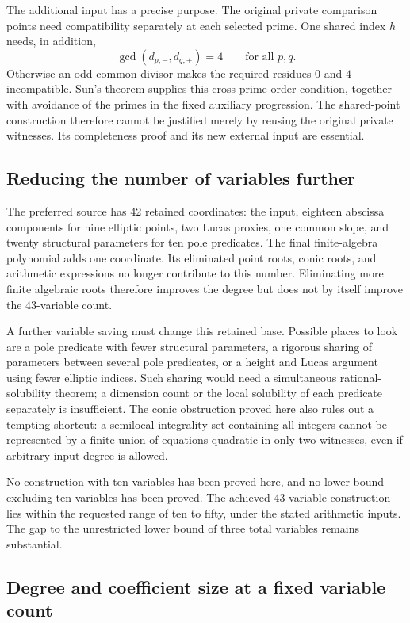 \documentclass[11pt]{article}
\theoremstyle{definition}
\begin{document}
The additional input has a precise purpose. The original private
comparison points need compatibility separately at each selected prime.
One shared index $h$ needs, in addition,
\[
             \gcd(d_{p,-},d_{q,+})=4\qquad\text{for all }p,q.
\]
Otherwise an odd common divisor makes the required residues $0$ and $4$
incompatible. Sun's theorem supplies this cross-prime order condition,
together with avoidance of the primes in the fixed auxiliary progression.
The shared-point construction therefore cannot be justified merely by
reusing the original private witnesses. Its completeness proof and its
new external input are essential.

\subsection{Reducing the number of variables further}

The preferred source has 42 retained coordinates: the input, eighteen
abscissa components for nine elliptic points, two Lucas proxies, one
common slope, and twenty structural parameters for ten pole predicates.
The final finite-algebra polynomial adds one coordinate. Its eliminated
point roots, conic roots, and arithmetic expressions no longer contribute
to this number. Eliminating more finite algebraic roots therefore improves
the degree but does not by itself improve the 43-variable count.

A further variable saving must change this retained base. Possible places
to look are a pole predicate with fewer structural parameters, a rigorous
sharing of parameters between several pole predicates, or a height and
Lucas argument using fewer elliptic indices. Such sharing would need a
simultaneous rational-solubility theorem; a dimension count or the local
solubility of each predicate separately is insufficient. The conic
obstruction proved here also rules out a tempting shortcut: a semilocal
integrality set containing all integers cannot be represented by a finite
union of equations quadratic in only two witnesses, even if arbitrary
input degree is allowed.

No construction with ten variables has been proved here, and no lower
bound excluding ten variables has been proved. The achieved 43-variable
construction lies within the requested range of ten to fifty, under the
stated arithmetic inputs. The gap to the unrestricted lower bound of
three total variables remains substantial.

\subsection{Degree and coefficient size at a fixed variable count}
\end{document}
